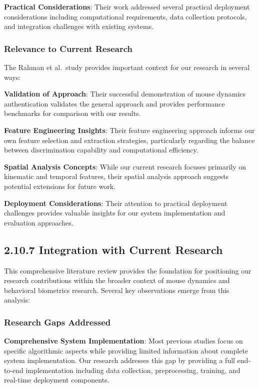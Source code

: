 \documentclass[
  12pt,
  a4paper,
]{report}
\begin{document}
\textbf{Practical Considerations}: Their work addressed several
practical deployment considerations including computational
requirements, data collection protocols, and integration challenges with
existing systems.

\subsubsection{Relevance to Current
Research}\label{relevance-to-current-research}

The Rahman et al.~study provides important context for our research in
several ways:

\textbf{Validation of Approach}: Their successful demonstration of mouse
dynamics authentication validates the general approach and provides
performance benchmarks for comparison with our results.

\textbf{Feature Engineering Insights}: Their feature engineering
approach informs our own feature selection and extraction strategies,
particularly regarding the balance between discrimination capability and
computational efficiency.

\textbf{Spatial Analysis Concepts}: While our current research focuses
primarily on kinematic and temporal features, their spatial analysis
approach suggests potential extensions for future work.

\textbf{Deployment Considerations}: Their attention to practical
deployment challenges provides valuable insights for our system
implementation and evaluation approaches.

\subsection{2.10.7 Integration with Current
Research}\label{integration-with-current-research}

This comprehensive literature review provides the foundation for
positioning our research contributions within the broader context of
mouse dynamics and behavioral biometrics research. Several key
observations emerge from this analysis:

\subsubsection{Research Gaps Addressed}\label{research-gaps-addressed}

\textbf{Comprehensive System Implementation}: Most previous studies
focus on specific algorithmic aspects while providing limited
information about complete system implementation. Our research addresses
this gap by providing a full end-to-end implementation including data
collection, preprocessing, training, and real-time deployment
components.
\end{document}

